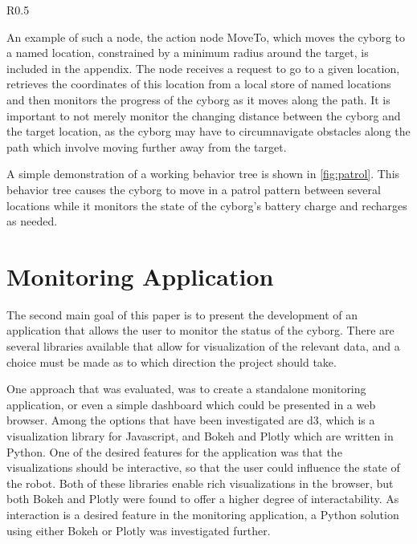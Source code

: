 \documentclass[\rootfolder/main.tex]{subfiles}
\begin{document}
\begin{wrapfigure}{R}{0.5\columnwidth}
    \caption{Behavior tree that checks battery state, and charges if necessary, while patrolling.\label{fig:patrol}}
\end{wrapfigure}

An example of such a node, the action node MoveTo, which moves the cyborg to a named location, constrained by a minimum radius around the target, is included in the appendix.
The node receives a request to go to a given location, retrieves the coordinates of this location from a local store of named locations and then monitors the progress of the cyborg as it moves along the path.
It is important to not merely monitor the changing distance between the cyborg and the target location, as the cyborg may have to circumnavigate obstacles along the path which involve moving further away from the target.

A simple demonstration of a working behavior tree is shown in \cref{fig:patrol}.
This behavior tree causes the cyborg to move in a patrol pattern between several locations while it monitors the state of the cyborg's battery charge and recharges as needed.

\section{Monitoring Application}

The second main goal of this paper is to present the development of an application that allows the user to monitor the status of the cyborg.
There are several libraries available that allow for visualization of the relevant data, and a choice must be made as to which direction the project should take.

One approach that was evaluated, was to create a standalone monitoring application, or even a simple dashboard which could be presented in a web browser.
Among the options that have been investigated are d3, which is a visualization library for Javascript, and Bokeh and Plotly which are written in Python.
One of the desired features for the application was that the visualizations should be interactive, so that the user could influence the state of the robot.
Both of these libraries enable rich visualizations in the browser, but both Bokeh and Plotly were found to offer a higher degree of interactability.
As interaction is a desired feature in the monitoring application, a Python solution using either Bokeh or Plotly was investigated further.
\end{document}
